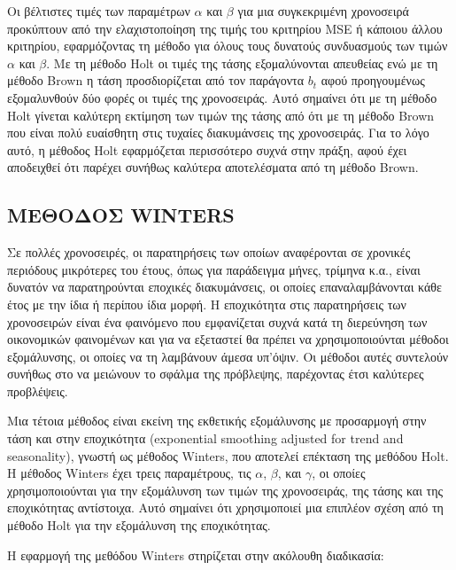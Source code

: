 Οι βέλτιστες τιμές των παραμέτρων $ \alpha $ και $ \beta $ για μια συγκεκριμένη χρονοσειρά
προκύπτουν από την ελαχιστοποίηση της τιμής του κριτηρίου MSE ή κάποιου άλλου
κριτηρίου, εφαρμόζοντας τη μέθοδο για όλους τους δυνατούς συνδυασμούς των
τιμών $ \alpha $ και $ \beta $. Με τη μέθοδο Holt οι τιμές της τάσης εξομαλύνονται απευθείας ενώ με
τη μέθοδο Brown η τάση προσδιορίζεται από τον παράγοντα $b_t$ αφού προηγουμένως
εξομαλυνθούν δύο φορές οι τιμές της χρονοσειράς. Αυτό σημαίνει ότι με τη μέθοδο
Holt γίνεται καλύτερη εκτίμηση των τιμών της τάσης από ότι με τη μέθοδο Brown
που είναι πολύ ευαίσθητη στις τυχαίες διακυμάνσεις της χρονοσειράς. Για το λόγο
αυτό, η μέθοδος Holt εφαρμόζεται περισσότερο συχνά στην πράξη, αφού έχει
αποδειχθεί ότι παρέχει συνήθως καλύτερα αποτελέσματα από τη μέθοδο Brown.

\subsection{ΜΕΘΟΔΟΣ WINTERS}
Σε πολλές χρονοσειρές, οι παρατηρήσεις των οποίων αναφέρονται σε χρονικές
περιόδους μικρότερες του έτους, όπως για παράδειγμα μήνες, τρίμηνα κ.α., είναι
δυνατόν να παρατηρούνται εποχικές διακυμάνσεις, οι οποίες επαναλαμβάνονται κάθε
έτος με την ίδια ή περίπου ίδια μορφή. Η εποχικότητα στις παρατηρήσεις των
χρονοσειρών είναι ένα φαινόμενο που εμφανίζεται συχνά κατά τη διερεύνηση των
οικονομικών φαινομένων και για να εξεταστεί θα πρέπει να χρησιμοποιούνται
μέθοδοι εξομάλυνσης, οι οποίες να τη λαμβάνουν άμεσα υπ’όψιν. Οι μέθοδοι αυτές
συντελούν συνήθως στο να μειώνουν το σφάλμα της πρόβλεψης, παρέχοντας έτσι
καλύτερες προβλέψεις.

Μια τέτοια μέθοδος είναι εκείνη της εκθετικής εξομάλυνσης με προσαρμογή στην
τάση και στην εποχικότητα (exponential smoothing adjusted for trend and
seasonality), γνωστή ως μέθοδος Winters, που αποτελεί επέκταση της μεθόδου Holt.
Η μέθοδος Winters έχει τρεις παραμέτρους, τις $ \alpha$, $\beta$, και $\gamma$, οι οποίες
χρησιμοποιούνται για την εξομάλυνση των τιμών της χρονοσειράς, της τάσης και της
εποχικότητας αντίστοιχα. Αυτό σημαίνει ότι χρησιμοποιεί μια επιπλέον σχέση από τη
μέθοδο Holt για την εξομάλυνση της εποχικότητας.

Η εφαρμογή της μεθόδου Winters στηρίζεται στην ακόλουθη διαδικασία:\\

